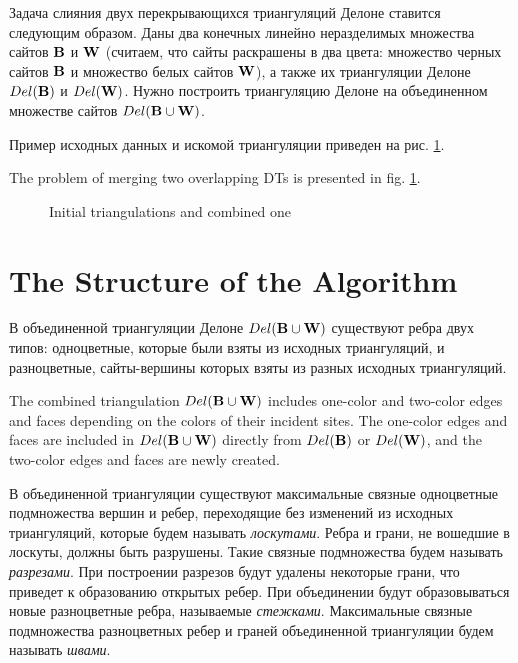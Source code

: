 \documentclass[12pt]{article}
\begin{document}
Задача слияния двух перекрывающихся триангуляций Делоне ставится следующим образом.
Даны два конечных линейно неразделимых множества сайтов $\bf{B}$ и $\bf{W}$ (считаем, что сайты раскрашены в два цвета: множество черных сайтов $\bf{B}$ и множество белых сайтов $\bf{W}$),
а также их триангуляции Делоне $Del(\bf{B})$ и $Del(\bf{W})$.
Нужно построить триангуляцию Делоне на объединенном множестве сайтов $Del(\bf{B} \cup \bf{W})$.

{\color{green}
Пример исходных данных и искомой триангуляции приведен на рис. \ref{fig:model_data}.
}

The problem of merging two overlapping DTs is presented in fig. \ref{fig:model_data}.

\begin{figure}[htb!]
	\begin{minipage}[h]{0.49\linewidth}
	\end{minipage}
	\hfill
	\begin{minipage}[h]{0.49\linewidth}
	\end{minipage}
	\caption{Initial triangulations and combined one}
	\label{fig:model_data}
\end{figure}

\section{The Structure of the Algorithm}
{\color{green}
В объединенной триангуляции Делоне $Del(\bf{B} \cup \bf{W})$ существуют ребра двух типов:
одноцветные, которые были взяты из исходных триангуляций, и разноцветные, сайты-вершины которых взяты из разных исходных триангуляций.
}

The combined triangulation $Del(\bf{B} \cup \bf{W})$ includes one-color and two-color edges and faces depending on the colors of their incident sites. The one-color edges and faces are included in $Del(\bf{B} \cup \bf{W})$ directly from $Del(\bf{B})$ or $Del(\bf{W})$, and the two-color edges and faces are newly created.

{\color{green}
В объединенной триангуляции существуют максимальные связные одноцветные подмножества вершин и ребер,
переходящие без изменений из исходных триангуляций, которые будем называть {\it лоскутами}.
Ребра и грани, не вошедшие в лоскуты, должны быть разрушены.
Такие связные подмножества будем называть {\it разрезами}.
При построении разрезов будут удалены некоторые грани, что приведет к образованию открытых ребер.
При объединении будут образовываться новые разноцветные ребра, называемые {\it стежками}.
Максимальные связные подмножества разноцветных ребер и граней объединенной триангуляции будем называть {\it швами}.
}
\end{document}
